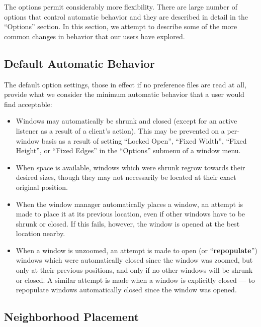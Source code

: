 The options permit considerably more flexibility.  There are large number
of options that control automatic behavior and they are described in
detail in the ``Options'' section.  In this section, we attempt to describe
some of the more common changes in behavior that our users have explored.

\subsection{Default Automatic Behavior}

The default option settings, those in effect if no preference files are
read at all, provide what we consider the minimum automatic behavior that
a user would find acceptable:

\begin{itemize}
\item Windows may automatically be shrunk and closed (except for an active
listener as a result of a client's action).  This may be prevented on a
per-window basis as a result of setting ``Locked Open'', ``Fixed Width'',
``Fixed Height'', or ``Fixed Edges'' in the ``Options'' submenu of a window
menu.

\item When space is available, windows which were shrunk regrow towards their
desired sizes, though they may not necessarily be located at their exact
original position.

\item When the window manager automatically places a window, an attempt is made
to place it at its previous location, even if other windows have to be
shrunk or closed.  If this fails, however, the window is opened at the
best location nearby.

\item When a window is unzoomed, an attempt is made to open (or
``{\bf repopulate}'') windows which were automatically closed
since the window was zoomed, but only at their previous positions, and
only if no other windows will be shrunk or closed.
A similar attempt is made when a window is explicitly closed --- to
repopulate windows automatically closed since the window was
opened.

\end{itemize}

\subsection{Neighborhood Placement}


